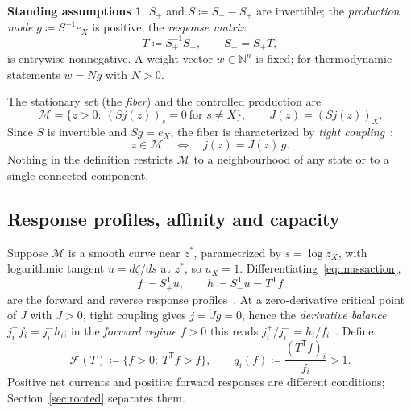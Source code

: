 \documentclass[11pt,a4paper]{article}
\theoremstyle{plain}
\theoremstyle{definition}
\newtheorem{assumption}[theorem]{Standing assumptions}
\theoremstyle{remark}
\numberwithin{equation}{section}
\newcommand{\N}{\mathbb{N}}
\newcommand{\T}{\mathsf{T}}
\newcommand{\Sp}{S_{+}}
\newcommand{\Sm}{S_{-}}
\newcommand{\cone}{\mathcal{F}}
\newcommand{\fiber}{\mathcal{M}}
\begin{document}
\begin{assumption}\label{ass:standing}
$\Sp$ and $S\coloneqq\Sm-\Sp$ are invertible; the \emph{production mode} $g\coloneqq S^{-1}e_X$ is positive; the \emph{response matrix}
\begin{equation}\label{eq:T}
 T\coloneqq\Sp^{-1}\Sm,\qquad \Sm=\Sp T,
\end{equation}
is entrywise nonnegative. A weight vector $w\in\N^n$ is fixed; for thermodynamic statements $w=Ng$ with $N>0$.
\end{assumption}

The stationary set (the \emph{fiber}) and the controlled production are
\begin{equation}\label{eq:fiber}
 \fiber=\{z>0:\ (Sj(z))_s=0\ \text{for } s\ne X\},\qquad J(z)=(Sj(z))_X .
\end{equation}
Since $S$ is invertible and $Sg=e_X$, the fiber is characterized by \emph{tight coupling}~\citep[Eq.~(21)]{despons2024}:
\begin{equation}\label{eq:tight}
 z\in\fiber\quad\Longleftrightarrow\quad j(z)=J(z)\,g .
\end{equation}
Nothing in the definition restricts $\fiber$ to a neighbourhood of any state or to a single connected component.

\subsection{Response profiles, affinity and capacity}
Suppose $\fiber$ is a smooth curve near $z^*$, parametrized by $s=\log z_X$, with logarithmic tangent $u=d\zeta/ds$ at $z^*$, so $u_X=1$. Differentiating~\eqref{eq:massaction},
\begin{equation}\label{eq:fh}
 f\coloneqq\Sp^{\T}u,\qquad h\coloneqq\Sm^{\T}u=T^{\T}f
\end{equation}
are the forward and reverse response profiles~\citep[Eq.~(26)]{despons2024}. At a zero-derivative critical point of $J$ with $J>0$, tight coupling gives $\dot j=\dot Jg=0$, hence the \emph{derivative balance} $j^+_if_i=j^-_ih_i$; in the \emph{forward regime} $f>0$ this reads $j^+_i/j^-_i=h_i/f_i$~\citep[Eqs.~(27)--(30)]{despons2024}. Define
\begin{equation}\label{eq:cone}
 \cone(T)\coloneqq\{f>0:\ T^{\T}f>f\},\qquad q_i(f)\coloneqq\frac{(T^{\T}f)_i}{f_i}>1 .
\end{equation}
Positive net currents and positive forward responses are different conditions; Section~\ref{sec:rooted} separates them.
\end{document}
